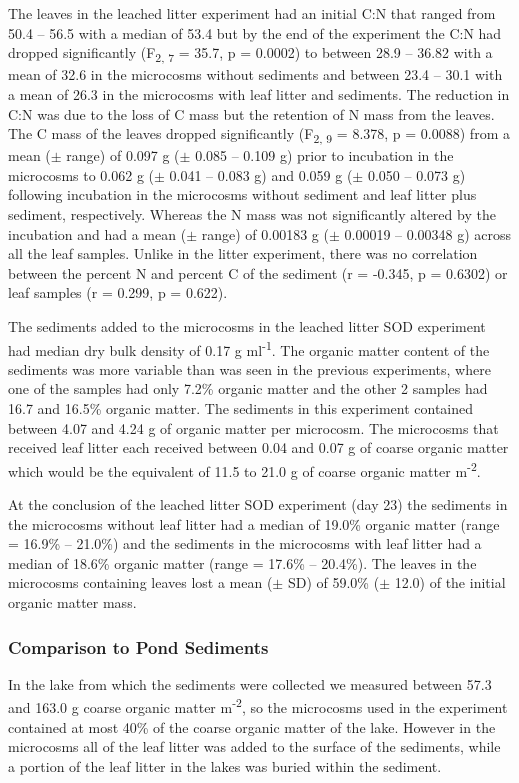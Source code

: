 The leaves in the leached litter experiment had an initial C:N that ranged from 50.4 -- 56.5 with a median of 53.4 but by the end of the experiment the C:N had dropped significantly (F\textsubscript{2, 7} = 35.7, p = 0.0002) to between 28.9 -- 36.82 with a mean of 32.6 in the microcosms without sediments and between 23.4 -- 30.1 with a mean of 26.3 in the microcosms with leaf litter and sediments. The reduction in C:N was due to the loss of C mass but the retention of N mass from the leaves. The C mass of the leaves dropped significantly (F\textsubscript{2, 9} = 8.378, p = 0.0088) from a mean ($\pm$ range) of 0.097 g ($\pm$ 0.085 -- 0.109 g) prior to incubation in the microcosms to 0.062 g ($\pm$ 0.041 -- 0.083 g) and 0.059 g ($\pm$ 0.050 -- 0.073 g) following incubation in the microcosms without sediment and leaf litter plus sediment, respectively. Whereas the N mass was not significantly altered by the incubation and had a mean ($\pm$ range) of 0.00183 g ($\pm$ 0.00019 -- 0.00348 g) across all the leaf samples. Unlike in the litter experiment, there was no correlation between the percent N and percent C of the sediment (r = -0.345, p = 0.6302) or leaf samples (r = 0.299, p = 0.622).

The sediments added to the microcosms in the leached litter SOD experiment had  median dry bulk density of 0.17 g ml\textsuperscript{-1}. The organic matter content of the sediments was more variable than was seen in the previous experiments, where one of the samples had only 7.2\% organic matter and the other 2 samples had 16.7 and 16.5\% organic matter. The sediments in this experiment contained between 4.07 and 4.24 g of organic matter per microcosm. The microcosms that received leaf litter each received between 0.04 and 0.07 g of coarse organic matter which would be the equivalent of 11.5 to 21.0 g of coarse organic matter m\textsuperscript{-2}.

At the conclusion of the leached litter SOD experiment (day 23) the sediments in the microcosms without leaf litter had a median of 19.0\% organic matter (range = 16.9\% -- 21.0\%) and the sediments in the microcosms with leaf litter had a median of 18.6\% organic matter (range = 17.6\% -- 20.4\%). The leaves in the microcosms containing leaves lost a mean ($\pm$ SD) of 59.0\% ($\pm$ 12.0) of the initial organic matter mass.
\subsubsection{Comparison to Pond Sediments}
In the lake from which the sediments were collected we measured between 57.3 and 163.0 g coarse organic matter m\textsuperscript{-2}, so the microcosms used in the experiment contained at most 40\% of the coarse organic matter of the lake. However in the microcosms all of the leaf litter was added to the surface of the sediments, while a portion of the leaf litter in the lakes was buried within the sediment.

